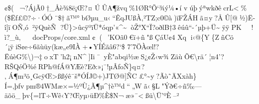 ¢\$ (~                                  ¬?ÁjÃ0†\_Åè¾8ë¡Œ?¤ÚÛA¶žvq\%1ØR°Õ`¾ý¼•í
vúþýªwkðêcrL\textless\%(\$Ëƒ£©?÷·ÓÓ¨\$†ã™°bØµu\_u\textbar‹``ÊqJUßÀ,²TZ\textquotesingle;c0©à)ïFŽÁHã¤y?ÅÛ{[}@½)Ë­î{]}ïOÑ,ó²ÿQuèÑ
?Ü\}\textgreater ûcÿºïÜ*óqp'«\^{}\textasciitildeòŽ°X``Ï?oðlB†3êúû``-´µþ+Ü\textasciitilde  ÿÿ PK     ! ì?\_ù‚     docProps/core.xml
¢(~                                                                                                                                                                                                                                                                 \textbar'KOã0€ï+ñ"ßÇáU¢4 Xq
i‹@\{Y\{ZñCö´¡ÿ\textquotesingle iS¢e÷6ãùüy(kæ„e9IÀ+•YÍÉãâ6?{}`\$
7'7ÖÀœl!?ËúèG\%\textbackslash)¬‡oxT'h2¡nN\^{}{]}Ii¯~yÈ"abqi½æS¿¢Ž‹w¾ZäùÕ€\textbackslash rä´¦n4'?RŠQéÖ¾éRPh@ƒÁ@YÆè?Eð:\textbar»¡¯\textbar!µÂ­ƒoÑ\}q¤?‚Á¶m³ö¸GcÿŒ\textgreater ßßýê¯š*ÓÍJ ©+)JTØ@{]}ÑC£°\textasciitilde y?Ãò˜ÄXxàh\}Í=‚þƒvpm®4WMæ×=½\textquotesingle ºÙ¿Ã¶µ\^{}†è™d``„Wã‹§L"Ýð€÷ñ‰---
äõö\_þv\{=lT÷Wê‹Y?Œyµ›üÐ\%È\$N¬æ»¯\textlessßü\textbackslash Ü'ºÈ--²
